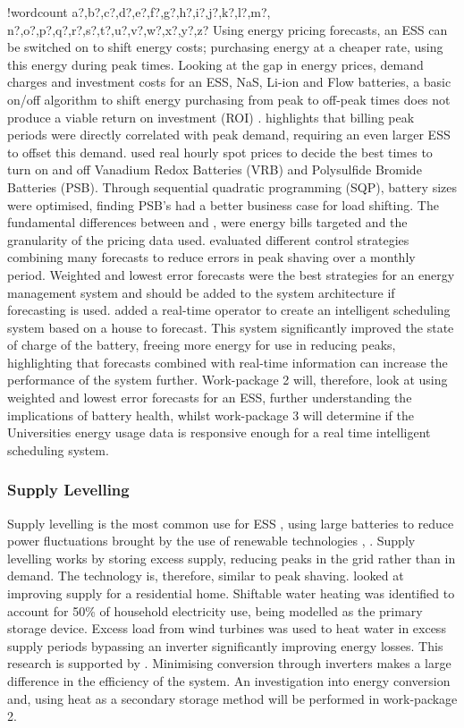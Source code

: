 \documentclass[fontsize=9.5pt]{extarticle}
\newcounter{words}
\newenvironment{counted}{%
  \setcounter{words}{0}
  \SearchList!{wordcount}{\stepcounter{words}}
    {a?,b?,c?,d?,e?,f?,g?,h?,i?,j?,k?,l?,m?,
    n?,o?,p?,q?,r?,s?,t?,u?,v?,w?,x?,y?,z?}
  \UndoBoundary{'}
  \SearchOrder{p;}}{%
  \StopSearching}
\begin{document}
\begin{counted}
Using energy pricing forecasts, an ESS can be switched on to shift
energy costs; purchasing energy at a cheaper rate, using this energy
during peak times. Looking at the gap in energy prices, demand charges
and investment costs for an ESS, NaS, Li-ion and Flow batteries, a basic
on/off algorithm to shift energy purchasing from peak to off-peak times
does not produce a viable return on investment (ROI) \cite{7555795}.
\cite{7555793} highlights that billing peak periods were directly
correlated with peak demand, requiring an even larger ESS to offset this
demand. \cite{5590194} used real hourly spot prices to decide the best
times to turn on and off Vanadium Redox Batteries (VRB) and Polysulfide
Bromide Batteries (PSB). Through sequential quadratic programming (SQP),
battery sizes were optimised, finding PSB's had a better business case
for load shifting. The fundamental differences between \cite{7555795}
and \cite{5590194}, were energy bills targeted and the granularity of
the pricing data used. \cite{6938948} evaluated different control
strategies combining many forecasts to reduce errors in peak shaving
over a monthly period. Weighted and lowest error forecasts were the best
strategies for an energy management system and should be added to the
system architecture if forecasting is used. \cite{Bennett2015122} added
a real-time operator to create an intelligent scheduling system based on
a house to forecast. This system significantly improved the state of
charge of the battery, freeing more energy for use in reducing peaks,
highlighting that forecasts combined with real-time information can
increase the performance of the system further. Work-package 2 will,
therefore, look at using weighted and lowest error forecasts for an ESS,
further understanding the implications of battery health, whilst
work-package 3 will determine if the Universities energy usage data is
responsive enough for a real time intelligent scheduling system.

\subsubsection{Supply Levelling}\label{supply-levelling}

Supply levelling is the most common use for ESS \cite{iearoadmapes},
using large batteries to reduce power fluctuations brought by the use of
renewable technologies \cite{7324861}, \cite{7564619}. Supply levelling
works by storing excess supply, reducing peaks in the grid rather than
in demand. The technology is, therefore, similar to peak shaving.
\cite{Allik20161116} looked at improving supply for a residential home.
Shiftable water heating was identified to account for 50\% of household
electricity use, being modelled as the primary storage device. Excess
load from wind turbines was used to heat water in excess supply periods
bypassing an inverter significantly improving energy losses. This
research is supported by \cite{Leadbetter2012685}. Minimising conversion
through inverters makes a large difference in the efficiency of the
system. An investigation into energy conversion and, using heat as a
secondary storage method will be performed in work-package 2.


\end{counted}
\end{document}
